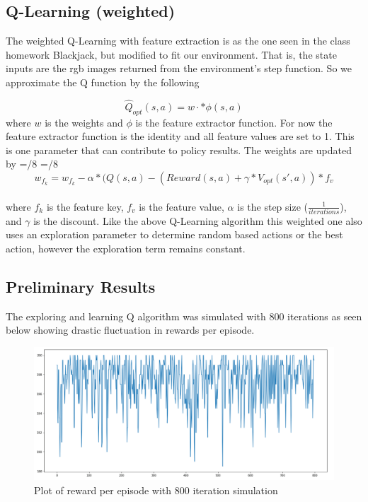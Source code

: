 \documentclass[10pt,twocolumn,letterpaper]{article}
\begin{document}
\subsection{Q-Learning (weighted)}
The weighted Q-Learning with feature extraction is as the one seen in the class homework Blackjack, but modified to fit our environment. That is, the state inputs are the rgb images returned from the environment's step function. So we approximate the Q function by the following

 $$\hat{Q}_{opt}(s,a)=w⋅*\phi(s,a) $$
 where $w$ is the weights and $\phi$ is the feature extractor function. For now the feature extractor function is the identity and all feature values are set to 1. This is one parameter that can contribute to policy results. 
 The weights are updated by
\noindent
\begingroup
  \small   
  \thinmuskip=\muexpr{}/8\relax
  \medmuskip=\muexpr{}/8\relax  
		 $$w_{f_k} = w_{f_k} - \alpha*(Q(s,a)-(Reward(s,a)+\gamma*V_{opt}(s',a))*f_v$$
\endgroup\\
where $f_k$ is the feature key, $f_v$ is the feature value, $\alpha$ is the step size ($\frac{1}{iterations}$), and $\gamma$ is the discount. 
Like the above Q-Learning algorithm this weighted one also uses an exploration parameter to determine random based actions or the best action, however the exploration term remains constant. 
\subsection{Preliminary Results}

The exploring and learning Q algorithm was simulated with 800 iterations as seen below showing drastic fluctuation in rewards per episode.

\begin{figure}[h]
\centering
\includegraphics[width=0.6\linewidth]{qlearning_exp.png}
\caption{Plot of reward per episode with 800 iteration simulation}
\end{figure}
\end{document}
